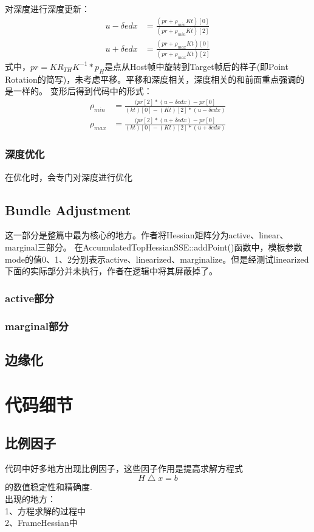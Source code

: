 \noindent 对深度进行深度更新：
\begin{equation}
\begin{aligned}
u-\delta e dx &= \frac{(pr + \rho_{min}Kt)[0]}{(pr + \rho_{min}Kt)[2]}\\
u+\delta e dx &= \frac{(pr + \rho_{max}Kt)[0]}{(pr + \rho_{max}Kt)[2]}
\end{aligned}
\end{equation}
式中，$pr=KR_{TH}K^{-1}*p_{H}$是点从Host帧中旋转到Target帧后的样子(即Point Rotation的简写)，未考虑平移。平移和深度相关，深度相关的和前面重点强调的是一样的。
变形后得到代码中的形式：
\begin{equation}
\begin{aligned}
\rho_{min}  &= \frac{(pr[2]*(u-\delta e dx)-pr[0]}{(kt)[0] - (Kt)[2]*(u-\delta e dx)}\\
\rho_{max}  &= \frac{(pr[2]*(u+\delta e dx)-pr[0]}{(kt)[0] - (Kt)[2]*(u+\delta e dx)}
\end{aligned}
\end{equation}

\subsection{深度优化}
在优化时，会专门对深度进行优化


\section{Bundle Adjustment}
\indent 这一部分是整篇中最为核心的地方。作者将Hessian矩阵分为active、linear、marginal三部分。
在AccumulatedTopHessianSSE::addPoint()函数中，模板参数mode的值0、1、2分别表示active、linearized、marginalize。但是经测试linearized下面的实际部分并未执行，作者在逻辑中将其屏蔽掉了。
\subsection*{active部分}

\subsection*{marginal部分}

\section{边缘化}


\chapter{代码细节}
\section{比例因子}
代码中好多地方出现比例因子，这些因子作用是提高求解方程式 $$ H\bigtriangleup\!x=b $$的数值稳定性和精确度.\\
出现的地方：\\
1、方程求解的过程中\\
2、FrameHessian中\\
